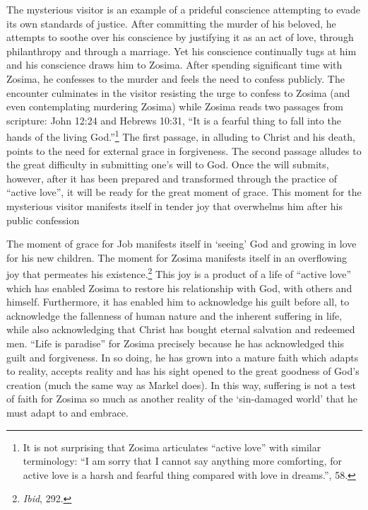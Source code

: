 The mysterious visitor is an example of a prideful conscience attempting to evade its own standards of justice. After committing the murder of his beloved, he attempts to soothe over his conscience by justifying it as an act of love, through philanthropy and through a marriage. Yet his conscience continually tugs at him and his conscience draws him to Zosima. After spending significant time with Zosima, he confesses to the murder and feels the need to confess publicly. The encounter culminates in the visitor resisting the urge to confess to Zosima (and even contemplating murdering Zosima) while Zosima reads two passages from scripture: John 12:24 and Hebrews 10:31, ``It is a fearful thing to fall into the hands of the living God.''\footnote{It is not surprising that Zosima articulates ``active love'' with similar terminology: ``I am sorry that I cannot say anything more comforting, for active love is a harsh and fearful thing compared with love in dreams.'', 58.} The first passage, in alluding to Christ and his death, points to the need for external grace in forgiveness. The second passage alludes to the great difficulty in submitting one's will to God. Once the will submits, however, after it has been prepared and transformed through the practice of ``active love'', it will be ready for the great moment of grace. This moment for the mysterious visitor manifests itself in tender joy that overwhelms him after his public confession

The moment of grace for Job manifests itself in `seeing' God and growing in love for his new children. The moment for Zosima manifests itself in an overflowing joy that permeates his existence.\footnote{\emph{Ibid}, 292.} This joy is a product of a life of ``active love'' which has enabled Zosima to restore his relationship with God, with others and himself. Furthermore, it has enabled him to acknowledge his guilt before all, to acknowledge the fallenness of human nature and the inherent suffering in life, while also acknowledging that Christ has bought eternal salvation and redeemed men. ``Life is paradise'' for Zosima precisely because he has acknowledged this guilt and forgiveness. In so doing, he has grown into a mature faith which adapts to reality, accepts reality and has his sight opened to the great goodness of God's creation (much the same way as Markel does). In this way, suffering is not a test of faith for Zosima so much as another reality of the `sin-damaged world' that he must adapt to and embrace. 


\pagebreak
